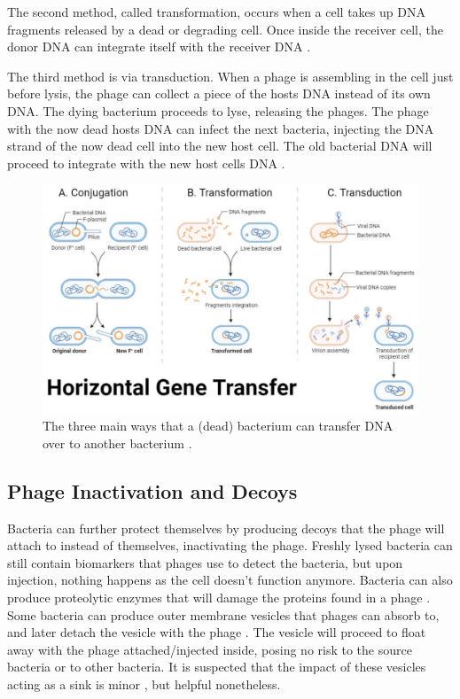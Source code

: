 The second method, called transformation, occurs when a cell takes up DNA fragments released by a dead or degrading cell. 
Once inside the receiver cell, the donor DNA can integrate itself with the receiver DNA \cite{chenInsOutsDNA2005}. 

The third method is via transduction. 
When a phage is assembling in the cell just before lysis, the phage can collect a piece of the hosts DNA instead of its own DNA. 
The dying bacterium proceeds to lyse, releasing the phages. 
The phage with the now dead hosts DNA can infect the next bacteria, injecting the DNA strand of the now dead cell into the new host cell. 
The old bacterial DNA will proceed to integrate with the new host cells DNA \cite{tamangHorizontalGeneTransfer2023, kasmanBacteriophages2025}. 

\begin{figure}
    \centering
    \includegraphics[width=0.7\linewidth]{Figures/horizontal_gene_transfer.png}
    \caption{The three main ways that a (dead) bacterium can transfer DNA over to another bacterium \cite{tamangHorizontalGeneTransfer2023}.}
    \label{fig:horizontal_gene_transfer}
\end{figure}

\subsection{Phage Inactivation and Decoys}
Bacteria can further protect themselves by producing decoys that the phage will attach to instead of themselves, inactivating the phage. 
Freshly lysed bacteria can still contain biomarkers that phages use to detect the bacteria, but upon injection, nothing happens as the cell doesn't function anymore. 
Bacteria can also produce proteolytic enzymes that will damage the proteins found in a phage \cite{tanQuorumSensingDetermines2015}. 
Some bacteria can produce outer membrane vesicles that phages can absorb to, and later detach the vesicle with the phage \cite{rabinovitchBacterialDebrisEcological2003}. 
The vesicle will proceed to float away with the phage attached/injected inside, posing no risk to the source bacteria or to other bacteria. 
It is suspected that the impact of these vesicles acting as a sink is minor \cite{bullPhageBacterialDynamicsSpatial2018}, but helpful nonetheless. 

